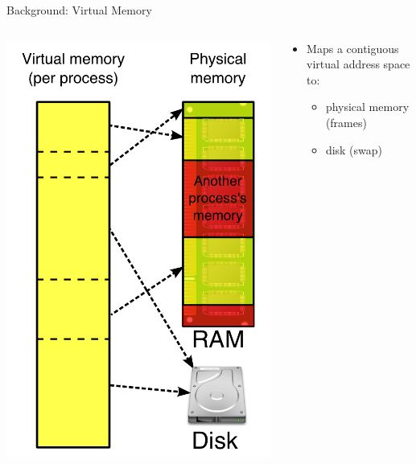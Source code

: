 \documentclass[aspectratio=169]{beamer}
\newcommand{\bi}{\begin{itemize}}
\newcommand{\ei}{\end{itemize}}
\begin{document}
\begin{frame}{Background: Virtual Memory}
  \begin{columns}[T]
    \begin{column}{0.3\textwidth}
      \includegraphics[scale=0.2]{./figures/Virtual_memory.png}
    \end{column}
    \begin{column}{0.7\textwidth}
      \bi
    \item Maps a contiguous virtual address space to:
      \bi
    \item physical memory (frames)
    \item disk (swap)
      \ei
      \ei
    \end{column}
  \end{columns}
\end{frame}
\end{document}
